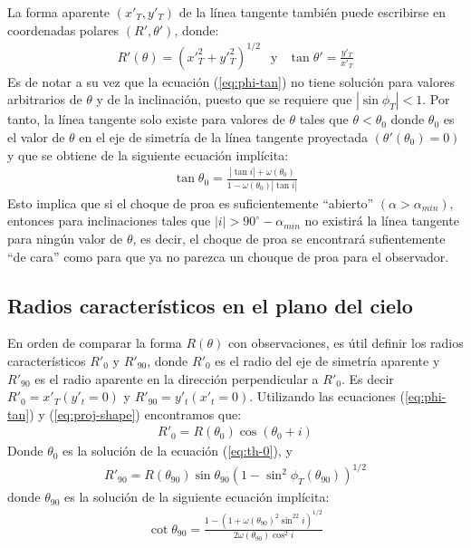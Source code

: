 La forma aparente $(x'_T, y'_T)$  de la línea tangente también puede escribirse
en coordenadas polares $(R', \theta')$, donde:
\begin{align}
  R'(\theta) = \left(x'^2_T + y'^2_T\right)^{1/2} & \mathrm{y} & \tan\theta' = \frac{y'_T}{x'_T}
  \label{eq:polar}
\end{align}
Es de notar a su vez que la ecuación (\ref{eq:phi-tan}) no tiene solución para valores
arbitrarios de $\theta$ y de la inclinación, puesto que se requiere que
$\left|\sin\phi_T\right| < 1$. Por tanto, la línea tangente solo existe para valores
de $\theta$ tales que $\theta < \theta_0$ donde $\theta_0$ es el valor de $\theta$ en
el eje de simetría de la línea tangente proyectada $(\theta'(\theta_0) = 0)$ y que se
obtiene de la siguiente ecuación implícita:
\begin{align}
  \tan\theta_0 = \frac{|\tan i| + \omega(\theta_0)}{1 - \omega(\theta_0)|\tan i|}
  \label{eq:th-0}
\end{align}
Esto implica que si el choque de proa es suficientemente ``abierto''
$(\alpha > \alpha_{min})$, entonces para inclinaciones tales que
$|i| > 90^\circ - \alpha_{min}$ no existirá la línea tangente para ningún valor de $\theta$,
es decir, el choque de proa se encontrará sufientemente ``de cara'' como para que ya no
parezca un chouque de proa para el observador.

\subsection{Radios característicos en el plano del cielo}

En orden de comparar la forma $R(\theta)$ con observaciones, es útil definir los radios
característicos $R'_0$ y $R'_{90}$, donde $R'_0$ es el radio del eje de simetría aparente
y $R'_{90}$ es el radio aparente en la dirección perpendicular a $R'_0$. Es decir
$R'_0 = x'_T(y'_t=0)$ y $R'_{90} = y'_t(x'_t = 0)$. Utilizando las ecuaciones
(\ref{eq:phi-tan}) y (\ref{eq:proj-shape}) encontramos que:
\begin{align}
R'_0 = R(\theta_0)\cos(\theta_0 + i)
\label{eq:R0p}
\end{align}
Donde $\theta_0$ es la solución de la ecuación (\ref{eq:th-0}), y
\begin{align}
  R'_{90} = R(\theta_{90})\sin\theta_{90}\left(1-\sin^2\phi_T(\theta_{90})\right)^{1/2}
  \label{eq:R90p}
\end{align}
donde $\theta_{90}$ es la solución de la siguiente ecuación implícita:
\begin{align}
  \cot\theta_{90} = \frac{1 - \left(1+\omega(\theta_{90})^2\sin^22i\right)^{1/2}}
  {2\omega(\theta_{90})\cos^2i}
  \label{eq:th90}
\end{align}

